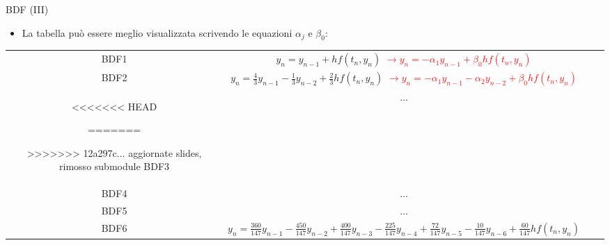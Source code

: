 \documentclass[aspectratio=169, 10pt, handout,usenames,dvipsnames]{beamer}
\begin{document}
\begin{frame}{BDF (III)}
        \begin{itemize}
            \item {La tabella può essere meglio visualizzata scrivendo le equazioni $\alpha_j$ e $\beta_0$:}
        \end{itemize}

    \begin{center}
        \begin{table}[]
            \begin{tabular}{ScSl}
            BDF1 & \( y_n = y_{n-1} + h f(t_{n}, y_{n})\) \textcolor{red}{\( \rightarrow  y_{n} = -\alpha_1y_{n-1} + \beta_0h f(t_{n}, y_{n})\)}\\
            BDF2 & \(y_{n} = \tfrac43 y_{n-1} - \tfrac13 y_{n-2} + \tfrac23 h f(t_{n}, y_{n}) \) \textcolor{red}{\(\rightarrow y_{n} = -\alpha_1y_{n-1} -\alpha_2y_{n-2} + \beta_0h f(t_{n}, y_{n}) \)}\\
<<<<<<< HEAD

=======

>>>>>>> 12a297c... aggiornate slides, rimosso submodule
            BDF3 & ...\\%
            BDF4 & ...\\ %
            BDF5 & ...\\ %
            BDF6 & \(y_{n} = \tfrac{360}{147} y_{n-1} - \tfrac{450}{147} y_{n-2} + \tfrac{400}{147} y_{n-3} - \tfrac{225}{147} y_{n-4} + \tfrac{72}{147} y_{n-5} - \tfrac{10}{147} y_{n-6} + \tfrac{60}{147} h f(t_{n}, y_{n}) \)
            \end{tabular}
        \end{table}
    \end{center}
\end{frame}
\end{document}
